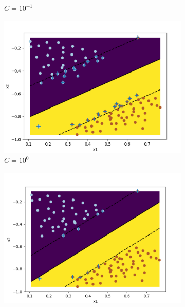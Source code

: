 \begin{figure}[H]
\begin{subfigure}{0.48\textwidth}
    	\caption{$C = 10^{-1}$}
	\end{subfigure}
	\begin{subfigure}{0.48\textwidth}
    	\includegraphics[width=\linewidth, height=1\linewidth]{img/10_0}	
    	\caption{$C = 10^{0}$}
	\end{subfigure}
	\begin{subfigure}{0.48\textwidth}
    	\includegraphics[width=\linewidth, height=1\linewidth]{img/10_1}	

\end{subfigure}
\end{figure}
